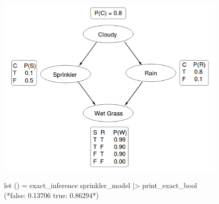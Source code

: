 \begin{figure}[!htb]
	\centering
	\begin{minipage}{0.47\linewidth}
		\label{lst:sprinkler}						
	\end{minipage}
	\begin{minipage}{0.47\linewidth}
		\includegraphics[width=\linewidth]{figs/sprinkler-network.png}
		\label{fig:sprinkler-network}
		\vspace{0.3cm}
		\begin{ocamlcode-in}
let () =
  exact_inference sprinkler_model
  |> print_exact_bool
(*false: 0.13706 true: 0.86294*)
		\end{ocamlcode-in}
		\label{lst:inf-output}					
	\end{minipage}
	\begin{minipage}{0.47\linewidth}
	\end{minipage}
	
\end{figure}



